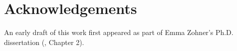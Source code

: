 \section*{Acknowledgements}
An early draft of this work first appeared as part of Emma Zohner's Ph.D. dissertation (\citeyear{zohner_feature_2021}, Chapter 2).


